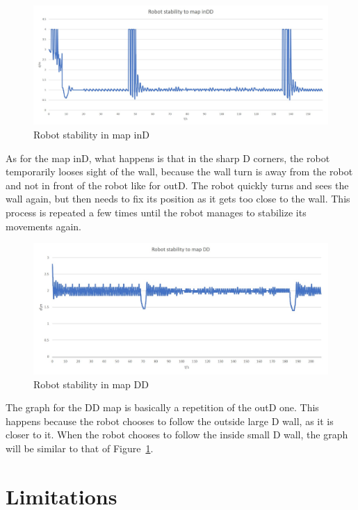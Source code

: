 \documentclass[10pt,journal,compsoc]{IEEEtran}
\begin{document}
\begin{figure}[thpb]
\centering
\includegraphics[scale=0.16]{img/map_inD.jpg}
\caption{Robot stability in map inD}
\label{fig:result_inD_map}
\end{figure}

As for the map inD, what happens is that in the sharp D corners, the robot temporarily looses sight of the wall, because the wall turn is away from the robot and not in front of the robot like for outD. The robot quickly turns and sees the wall again, but then needs to fix its position as it gets too close to the wall. This process is repeated a few times until the robot manages to stabilize its movements again.

\begin{figure}[thpb]
\centering
\includegraphics[scale=0.18]{img/map_DD.jpg}
\caption{Robot stability in map DD}
\label{fig:result_DD_map}
\end{figure}

The graph for the DD map is basically a repetition of the outD one. This happens because the robot chooses to follow the outside large D wall, as it is closer to it. When the robot chooses to follow the inside small D wall, the graph will be similar to that of Figure~\ref{fig:result_inD_map}.

\section{Limitations}
\end{document}
